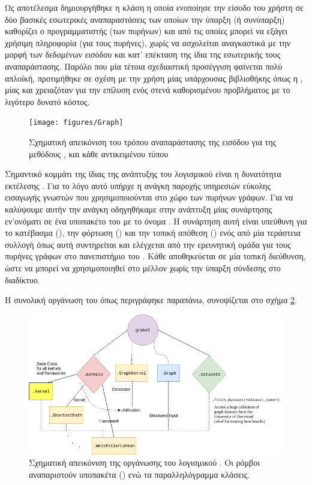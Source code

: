 Ως αποτέλεσμα δημιουργήθηκε η κλάση  η οποία ενοποίησε την είσοδο του χρήστη σε δύο βασικές εσωτερικές αναπαραστάσεις των οποίων την ύπαρξη (ή συνύπαρξη) καθορίζει ο προγραμματιστής (των πυρήνων) και από τις οποίες μπορεί να εξάγει χρήσιμη πληροφορία (για τους πυρήνες), χωρίς να ασχολείται αναγκαστικά με την μορφή των δεδομένων εισόδου και κατ' επέκταση της ίδια της εσωτερικής τους αναπαράστασης.
Παρόλο που μία τέτοια σχεδιαστική προσέγγιση φαίνεται πολύ απλοϊκή, προτιμήθηκε σε σχέση με την χρήση μίας υπάρχουσας βιβλιοθήκης όπως η , μίας και χρειαζόταν για την επίλυση ενός στενά καθορισμένου προβλήματος με το λιγότερο δυνατό κόστος.

\begin{figure}[]
    \centering
    \texttt{[image: figures/Graph]}
    \caption{Σχηματική απεικόνιση του τρόπου αναπαράστασης της εισόδου για της μεθόδους \texttt{}, \texttt{} και \texttt{} κάθε αντικειμένου τύπου }
    \label{fig:graph}
\end{figure}

Σημαντικό κομμάτι της ίδιας της ανάπτυξης του λογισμικού είναι η δυνατότητα εκτέλεσης .
Για το λόγο αυτό υπήρχε η ανάγκη παροχής υπηρεσιών εύκολης εισαγωγής γνωστών  που χρησιμοποιούνται στο χώρο των πυρήνων γράφων.
Για να καλύψουμε αυτήν την ανάγκη οδηγηθήκαμε στην ανάπτυξη μίας συνάρτησης εν'ονόματι  σε ένα υποπακέτο του  με το όνομα .
Η συνάρτηση αυτή είναι υπεύθυνη για το κατέβασμα (), την φόρτωση () και την τοπική απόθεση () ενός  από μία τεράστεια συλλογή όπως αυτή συντηρείται και ελέγχεται από την ερευνητική ομάδα για τους πυρήνες γράφων στο πανεπιστήμιο του  \cite{KKMMN2016}. Κάθε  αποθηκεύεται σε μία τοπική διεύθυνση, ώστε να μπορεί να χρησιμοποιηθεί στο μέλλον χωρίς την ύπαρξη σύνδεσης στο διαδίκτυο.

Η συνολική οργάνωση του  όπως περιγράφηκε παραπάνω, συνοψίζεται στο σχήμα \ref{fig:grakel}.
\begin{figure}[]
    \centering
    \includegraphics[width=\textwidth]{figures/grakel-schema}
    \caption[Σχηματική απεικόνιση της οργάνωσης του λογισμικού ]{Σχηματική απεικόνιση της οργάνωσης του λογισμικού . Οι ρόμβοι αναπαριστούν υποπακέτα () ενώ τα παραλληλόγραμμα κλάσεις.}
    \label{fig:grakel}
\end{figure}

